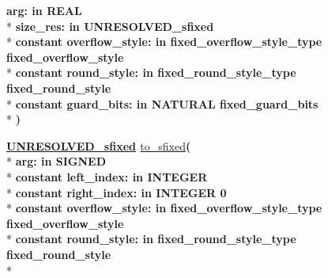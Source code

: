 \begin{DoxyCompactItemize}
{\bfseries \textcolor{vhdlchar}{arg\+: }\textcolor{stringliteral}{in }{\bfseries \textcolor{comment}{R\+E\+A\+L}\textcolor{vhdlchar}{ }}}\\*
{\bfseries \textcolor{vhdlchar}{size\+\_\+res\+: }\textcolor{stringliteral}{in }\textcolor{vhdlchar}{U\+N\+R\+E\+S\+O\+L\+V\+E\+D\+\_\+sfixed}}\\*
{\bfseries {\bfseries \textcolor{keywordflow}{constant}\textcolor{vhdlchar}{ }}\textcolor{vhdlchar}{overflow\+\_\+style\+: }\textcolor{stringliteral}{in }\textcolor{vhdlchar}{fixed\+\_\+overflow\+\_\+style\+\_\+type     fixed\+\_\+overflow\+\_\+style}}\\*
{\bfseries {\bfseries \textcolor{keywordflow}{constant}\textcolor{vhdlchar}{ }}\textcolor{vhdlchar}{round\+\_\+style\+: }\textcolor{stringliteral}{in }\textcolor{vhdlchar}{fixed\+\_\+round\+\_\+style\+\_\+type     fixed\+\_\+round\+\_\+style}}\\*
{\bfseries {\bfseries \textcolor{keywordflow}{constant}\textcolor{vhdlchar}{ }}\textcolor{vhdlchar}{guard\+\_\+bits\+: }\textcolor{stringliteral}{in }\textcolor{vhdlchar}{N\+A\+T\+U\+R\+A\+L     fixed\+\_\+guard\+\_\+bits}}\\*
{\bfseries  )} 
\item 
{\bfseries {\bfseries {\bfseries \hyperlink{classfixed__pkg_aa723b28a027c3c0f9bca02d75e8df4d6}{U\+N\+R\+E\+S\+O\+L\+V\+E\+D\+\_\+sfixed}} \textcolor{vhdlchar}{ }}} \hyperlink{classfixed__pkg_a440e389275888b28c0eff1c60223a3d0}{to\+\_\+sfixed}{\bfseries  ( }\\*
{\bfseries \textcolor{vhdlchar}{arg\+: }\textcolor{stringliteral}{in }{\bfseries \textcolor{comment}{S\+I\+G\+N\+E\+D}\textcolor{vhdlchar}{ }}}\\*
{\bfseries {\bfseries \textcolor{keywordflow}{constant}\textcolor{vhdlchar}{ }}\textcolor{vhdlchar}{left\+\_\+index\+: }\textcolor{stringliteral}{in }{\bfseries \textcolor{comment}{I\+N\+T\+E\+G\+E\+R}\textcolor{vhdlchar}{ }}}\\*
{\bfseries {\bfseries \textcolor{keywordflow}{constant}\textcolor{vhdlchar}{ }}\textcolor{vhdlchar}{right\+\_\+index\+: }\textcolor{stringliteral}{in }\textcolor{vhdlchar}{I\+N\+T\+E\+G\+E\+R   0}}\\*
{\bfseries {\bfseries \textcolor{keywordflow}{constant}\textcolor{vhdlchar}{ }}\textcolor{vhdlchar}{overflow\+\_\+style\+: }\textcolor{stringliteral}{in }\textcolor{vhdlchar}{fixed\+\_\+overflow\+\_\+style\+\_\+type     fixed\+\_\+overflow\+\_\+style}}\\*
{\bfseries {\bfseries \textcolor{keywordflow}{constant}\textcolor{vhdlchar}{ }}\textcolor{vhdlchar}{round\+\_\+style\+: }\textcolor{stringliteral}{in }\textcolor{vhdlchar}{fixed\+\_\+round\+\_\+style\+\_\+type     fixed\+\_\+round\+\_\+style}}\\*

\end{DoxyCompactItemize}
